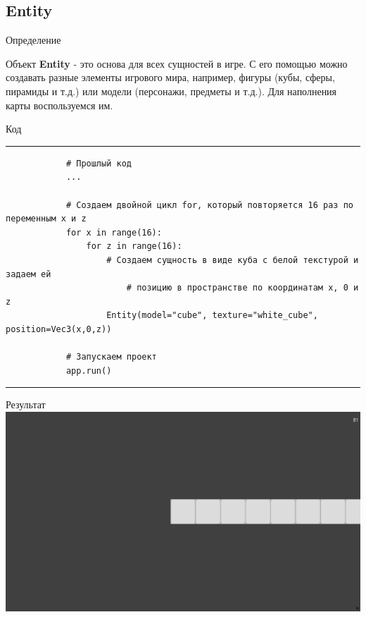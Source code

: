 \documentclass[handout]{beamer}
\begin{document}
    \subsection{Entity}
    \begin{frame}{Определение}
        \begin{justify}
            Объект \textbf{Entity} - это основа для всех сущностей в игре. С его помощью можно создавать разные элементы игрового мира, например, фигуры (кубы, сферы, пирамиды и т.д.) или модели (персонажи, предметы и т.д.). Для наполнения карты воспользуемся им.
        \end{justify}
    \end{frame}

    \begin{frame}[fragile]{Код}
        \scriptsize
        \rule{\textwidth}{1pt}
        \begin{verbatim}
            # Прошлый код
            ...
            
            # Создаем двойной цикл for, который повторяется 16 раз по переменным x и z
            for x in range(16): 
            	for z in range(16):
            	    # Создаем сущность в виде куба с белой текстурой и задаем ей 
                        # позицию в пространстве по координатам x, 0 и z
            	    Entity(model="cube", texture="white_cube", position=Vec3(x,0,z))
            
            # Запускаем проект
            app.run()
        \end{verbatim}
        \rule{\textwidth}{1pt}
    \end{frame}
    
    \begin{frame}{Результат}
        \includegraphics[width=\textwidth]{img/2.png}
    \end{frame}
\end{document}
